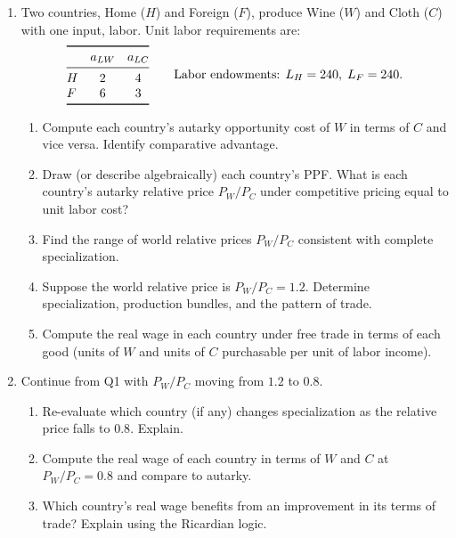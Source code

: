\documentclass[11pt]{article}
\begin{document}
\begin{enumerate}[leftmargin=*, resume]
\item 
Two countries, Home ($H$) and Foreign ($F$), produce Wine ($W$) and Cloth ($C$) with one input, labor. Unit labor requirements are:
\[
\begin{array}{@{}lcc@{}}
\toprule
 & a_{LW} & a_{LC} \\
\midrule
H & 2 & 4 \\
F & 6 & 3 \\
\bottomrule
\end{array}
\qquad
\text{Labor endowments: } L_H=240,\; L_F=240.
\]
\begin{enumerate}
\item Compute each country’s autarky opportunity cost of $W$ in terms of $C$ and vice versa. Identify comparative advantage.
\item Draw (or describe algebraically) each country’s PPF. What is each country’s autarky relative price $P_W/P_C$ under competitive pricing equal to unit labor cost?
\item Find the range of world relative prices $P_W/P_C$ consistent with complete specialization.
\item Suppose the world relative price is $P_W/P_C=1.2$. Determine specialization, production bundles, and the pattern of trade.
\item Compute the real wage in each country under free trade in terms of each good (units of $W$ and units of $C$ purchasable per unit of labor income).
\end{enumerate}

\item 
Continue from Q1 with $P_W/P_C$ moving from $1.2$ to $0.8$.
\begin{enumerate}
\item Re-evaluate which country (if any) changes specialization as the relative price falls to $0.8$. Explain.
\item Compute the real wage of each country in terms of $W$ and $C$ at $P_W/P_C=0.8$ and compare to autarky.
\item Which country’s real wage benefits from an improvement in its terms of trade? Explain using the Ricardian logic.
\end{enumerate}


\end{enumerate}
\end{document}
